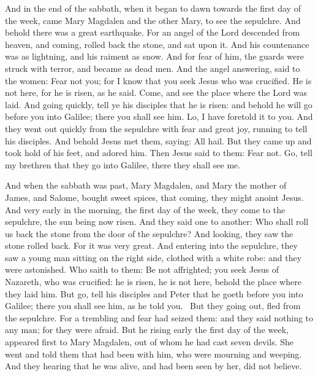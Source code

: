 And in the end of the sabbath, when it began to dawn towards the first day of the week, came Mary Magdalen and the other Mary, to see the sepulchre. And behold there was a great earthquake. For an angel of the Lord descended from heaven, and coming, rolled back the stone, and sat upon it. And his countenance was as lightning, and his raiment as snow. And for fear of him, the guards were struck with terror, and became as dead men. And the angel answering, said to the women: Fear not you; for I know that you seek Jesus who was crucified. He is not here, for he is risen, as he said. Come, and see the place where the Lord was laid. And going quickly, tell ye his disciples that he is risen: and behold he will go before you into Galilee; there you shall see him. Lo, I have foretold it to you. And they went out quickly from the sepulchre with fear and great joy, running to tell his disciples. And behold Jesus met them, saying: All hail. But they came up and took hold of his feet, and adored him. Then Jesus said to them: Fear not. Go, tell my brethren that they go into Galilee, there they shall see me.

And when the sabbath was past, Mary Magdalen, and Mary the mother of James, and Salome, bought sweet spices, that coming, they might anoint Jesus. And very early in the morning, the first day of the week, they come to the sepulchre, the sun being now risen. And they said one to another: Who shall roll us back the stone from the door of the sepulchre? And looking, they saw the stone rolled back. For it was very great. And entering into the sepulchre, they saw a young man sitting on the right side, clothed with a white robe: and they were astonished. Who saith to them: Be not affrighted; you seek Jesus of Nazareth, who was crucified: he is risen, he is not here, behold the place where they laid him. But go, tell his disciples and Peter that he goeth before you into Galilee; there you shall see him, as he told you.  But they going out, fled from the sepulchre. For a trembling and fear had seized them: and they said nothing to any man; for they were afraid. But he rising early the first day of the week, appeared first to Mary Magdalen, out of whom he had cast seven devils. She went and told them that had been with him, who were mourning and weeping. And they hearing that he was alive, and had been seen by her, did not believe.

